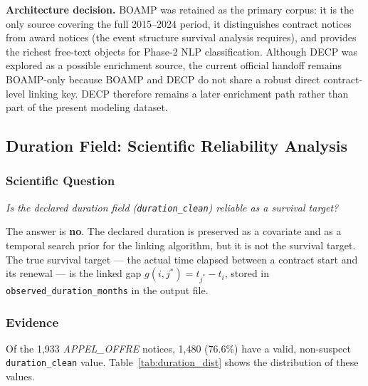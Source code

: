 \documentclass[12pt, a4paper]{article}
\begin{document}
\noindent\textbf{Architecture decision.} BOAMP was retained as the primary corpus: it is
the only source covering the full 2015--2024 period, it distinguishes contract notices from
award notices (the event structure survival analysis requires), and provides the richest
free-text objects for Phase-2 NLP classification. Although DECP was explored as a possible
enrichment source, the current official handoff remains BOAMP-only because BOAMP and DECP do
not share a robust direct contract-level linking key. DECP therefore remains a later
enrichment path rather than part of the present modeling dataset.

\subsection{Duration Field: Scientific Reliability Analysis}
\label{sec:duration_science}

\subsubsection*{Scientific Question}

\textit{Is the declared duration field (\texttt{duration\_clean}) reliable as
a survival target?}

The answer is \textbf{no}. The declared duration is preserved as a covariate
and as a temporal search prior for the linking algorithm, but it is not the
survival target. The true survival target --- the actual time elapsed between
a contract start and its renewal --- is the linked gap
$g(i, j^*) = t_{j^*} - t_i$, stored in \texttt{observed\_duration\_months}
in the output file.

\subsubsection*{Evidence}

Of the 1,933 \textit{APPEL\_OFFRE} notices, 1,480 (76.6\%) have a valid, non-suspect
\texttt{duration\_clean} value. Table~\ref{tab:duration_dist} shows the distribution
of these values.
\end{document}

